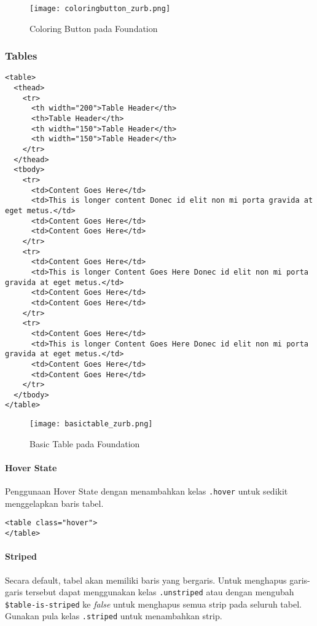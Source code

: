 \begin{enumerate}
\begin{figure} [H]
	\centering  
	\texttt{[image: coloringbutton\_zurb.png]}  
	\caption{Coloring Button pada Foundation}
	\label{fig:gridbasic_zurb} 
\end{figure}

\subsubsection{Tables}
\label{sssec:css_2}
\begin{lstlisting}[frame=single] 
<table>
  <thead>
    <tr>
      <th width="200">Table Header</th>
      <th>Table Header</th>
      <th width="150">Table Header</th>
      <th width="150">Table Header</th>
    </tr>
  </thead>
  <tbody>
    <tr>
      <td>Content Goes Here</td>
      <td>This is longer content Donec id elit non mi porta gravida at eget metus.</td>
      <td>Content Goes Here</td>
      <td>Content Goes Here</td>
    </tr>
    <tr>
      <td>Content Goes Here</td>
      <td>This is longer Content Goes Here Donec id elit non mi porta gravida at eget metus.</td>
      <td>Content Goes Here</td>
      <td>Content Goes Here</td>
    </tr>
    <tr>
      <td>Content Goes Here</td>
      <td>This is longer Content Goes Here Donec id elit non mi porta gravida at eget metus.</td>
      <td>Content Goes Here</td>
      <td>Content Goes Here</td>
    </tr>
  </tbody>
</table>
\end{lstlisting}

\begin{figure} [H]
	\centering  
	\texttt{[image: basictable\_zurb.png]}  
	\caption{Basic Table pada Foundation}
	\label{fig:gridbasic_zurb} 
\end{figure}

\paragraph{Hover State}
Penggunaan Hover State dengan menambahkan kelas \texttt{.hover} untuk sedikit menggelapkan baris tabel.
\begin{lstlisting}[frame=single] 
<table class="hover">
</table>
\end{lstlisting}

\paragraph{Striped}
Secara default, tabel akan memiliki baris yang bergaris. Untuk menghapus garis-garis tersebut dapat menggunakan kelas \texttt{.unstriped} atau dengan mengubah \verb|$table-is-striped| ke \textit{false} untuk menghapus semua strip pada seluruh tabel. Gunakan pula kelas \texttt{.striped} untuk menambahkan strip.\cite{zurbfoundation:17}


\end{enumerate}
